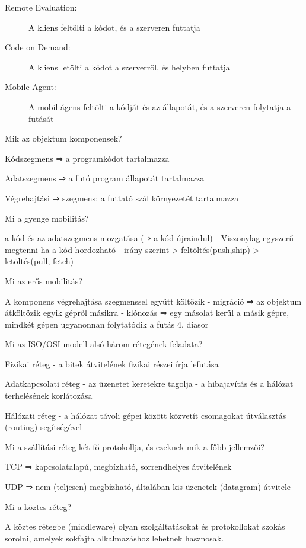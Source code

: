 \documentclass[12pt]{article}
\begin{document}
\begin{description}[style=unboxed]
\begin{description}
            \item [Remote Evaluation:]A kliens feltölti a kódot, és a szerveren futtatja
            \item [Code on Demand:]A kliens letölti a kódot a szerverről, és helyben futtatja
            \item [Mobile Agent:]A mobil ágens feltölti a kódját és az állapotát, és a szerveren folytatja a futását
        \end{description}
    \item  Mik az objektum komponensek?
    \item Kódszegmens  ⇒ a programkódot tartalmazza
    \item Adatszegmens ⇒ a futó program állapotát tartalmazza
    \item Végrehajtási ⇒ szegmens: a futtató szál környezetét tartalmazza
    \item  Mi a gyenge mobilitás?
    \item a kód és az adatszegmens mozgatása (⇒ a kód újraindul)
        - Viszonylag egyszerű megtenni ha a kód hordozható
        - irány szerint
        > feltöltés(push,ship)
        > letöltés(pull, fetch)
    \item  Mi az erős mobilitás?
    \item A komponens végrehajtása szegmenssel együtt költözik
        - migráció ⇒ az objektum átköltözik egyik gépről másikra
        - klónozás ⇒ egy másolat kerül a másik gépre, mindkét gépen ugyanonnan folytatódik a futás
        4. diasor
    \item  Mi az ISO/OSI modell alsó három rétegének feladata?
    \item Fizikai réteg
        - a bitek átvitelének fizikai részei írja lefutása
    \item Adatkapcsolati réteg
        - az üzenetet keretekre tagolja
        - a hibajavítás és a hálózat terhelésének korlátozása
    \item Hálózati réteg
        - a hálózat távoli gépei között közvetít csomagokat útválasztás (routing) segítségével
    \item  Mi a szállítási réteg két fő protokollja, és ezeknek mik a főbb jellemzői?
    \item TCP ⇒ kapcsolatalapú, megbízható, sorrendhelyes átvitelének
    \item UDP ⇒ nem (teljesen) megbízható, általában kis üzenetek (datagram) átvitele	
    \item  Mi a köztes réteg?
    \item A köztes rétegbe (middleware) olyan szolgáltatásokat és protokollokat szokás sorolni, amelyek sokfajta alkalmazáshoz lehetnek hasznosak.

\end{description}
\end{document}
